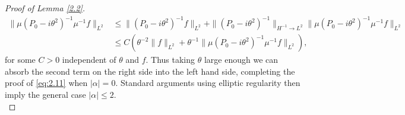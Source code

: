 \documentclass[10pt,a4paper]{amsart}
\begin{document}
\begin{proof}[Proof of Lemma \ref{2.2}]
\begin{equation*}
\begin{split}
\| \mu (P_0 - i\theta^2)^{-1} \mu^{-1} f \|_{L^2} &\le \| (P_0 - i\theta^2)^{-1} f \|_{L^2} + \| (P_0 - i\theta^2)^{-1} \|_{H^{-1} \to L^2} \| \mu (P_0 - i\theta^2)^{-1} \mu^{-1} f \|_{L^2} \\
& \le C(\theta^{-2} \| f\|_{L^2} + \theta^{-1} \| \mu (P_0 - i\theta^2)^{-1} \mu^{-1} f \|_{L^2}),
\end{split} 
\end{equation*}
for some $C > 0$ independent of $\theta$ and $f$. Thus taking $\theta$ large enough we can absorb the second term on the right side into the left hand side, completing the proof of \eqref{eq:2.11} when $|\alpha| = 0$. Standard arguments using elliptic regularity then imply the general case  $|\alpha | \le 2$.\\
 \end{proof}
\end{document}
